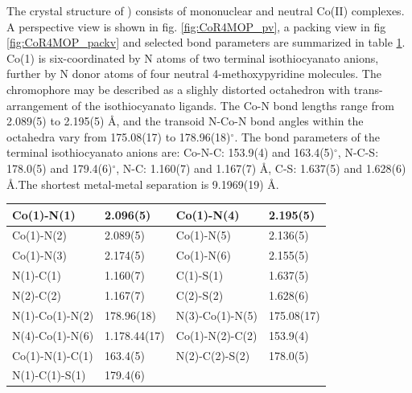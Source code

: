 The crystal structure of ) consists of mononuclear and neutral Co(II) complexes. A perspective view is shown in fig. \ref{fig:CoR4MOP_pv}, a packing view in fig \ref{fig:CoR4MOP_packv} and selected bond parameters are summarized in table \ref{batlb:CoR4MOP}. Co(1) is six-coordinated by N atoms of two terminal isothiocyanato anions, further by N donor atoms of four neutral 4-methoxypyridine molecules. The  chromophore may be described as a slighly distorted octahedron with trans-arrangement of the isothiocyanato ligands. The Co-N bond lengths range from 2.089(5) to 2.195(5) \AA, and the transoid N-Co-N bond angles within the  octahedra vary from 175.08(17) to 178.96(18)$^\circ$. The bond parameters of the terminal isothiocyanato anions are: Co-N-C: 153.9(4) and 163.4(5)$^\circ$, N-C-S: 178.0(5) and 179.4(6)$^\circ$, N-C: 1.160(7) and 1.167(7) \AA, C-S: 1.637(5) and 1.628(6) \AA.The shortest metal-metal separation is 9.1969(19) \AA. 

\begin{table}[htpb!]
\centering
{}
\begin{tabular}{|l|l|l|l|}
\hline
Co(1)-N(1) & 2.096(5) & Co(1)-N(4) & 2.195(5)\\
\hline
Co(1)-N(2) & 2.089(5) & Co(1)-N(5) & 2.136(5)\\
\hline
Co(1)-N(3) & 2.174(5) & Co(1)-N(6) & 2.155(5)\\
\hline
N(1)-C(1) & 1.160(7) & C(1)-S(1) & 1.637(5)\\
\hline
N(2)-C(2) & 1.167(7) & C(2)-S(2) & 1.628(6)\\
\hline
\hline
N(1)-Co(1)-N(2) & 178.96(18) & N(3)-Co(1)-N(5) & 175.08(17)\\
\hline
N(4)-Co(1)-N(6) & 1.178.44(17) & Co(1)-N(2)-C(2) & 153.9(4)\\
\hline
Co(1)-N(1)-C(1) & 163.4(5) & N(2)-C(2)-S(2) & 178.0(5)\\
\hline
N(1)-C(1)-S(1) & 179.4(6) & & \\
\hline
\end{tabular}
\label{batlb:CoR4MOP}
\end{table}



